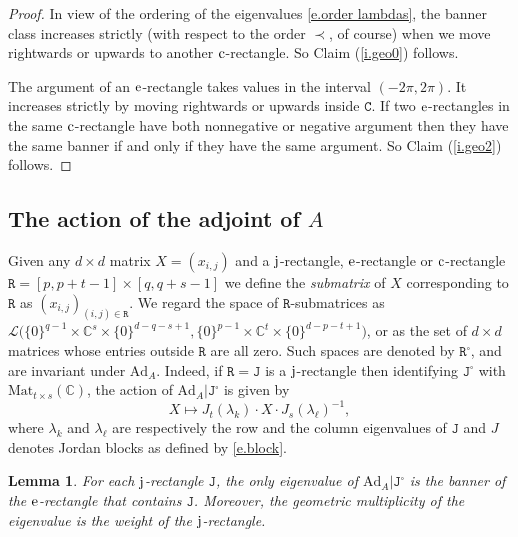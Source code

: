 \documentclass[10pt, a4paper]{amsart}
\theoremstyle{plain}
\newtheorem{lemma}{Lemma}[section]
\theoremstyle{definition}
\theoremstyle{remark}
\theoremstyle{note}
\numberwithin{equation}{section}
\begin{document}
\begin{proof}
In view of the ordering of the eigenvalues \eqref{e.order lambdas},
the banner class increases strictly (with respect to the order $\prec$, of course)
when we move rightwards or upwards to another $\rm c$-rectangle.
So Claim (\ref{i.geo0}) follows.

The argument of an $\rm e$-rectangle takes values in the interval $(-2\pi,2\pi)$.
It increases strictly by moving rightwards or upwards inside ${\mathtt{C}}$. 
If two $\rm e$-rectangles in the same $\rm c$-rectangle have both nonnegative or negative argument then 
they have the same banner if and only if they have the same argument.
So Claim (\ref{i.geo2}) follows.
\end{proof}

\subsection{The action of the adjoint of $A$}\label{ss.ad_geo}

Given any $d\times d$ matrix $X = (x_{i,j})$ and 
a $\rm j$-rectangle, $\rm e$-rectangle or $\rm c$-rectangle ${\mathtt{R}} = [p,p+t-1] \times [q, q+s-1]$
we define the \emph{submatrix} of $X$ corresponding to ${\mathtt{R}}$ 
as $(x_{i,j})_{(i,j) \in {\mathtt{R}}}$.
We regard the space of ${\mathtt{R}}$-submatrices as 
$\mathcal{L} \big( \{0\}^{q-1} \times {\mathbb{C}}^s \times \{0\}^{d-q-s+1} , \{0\}^{p-1} \times {\mathbb{C}}^t \times \{0\}^{d-p-t+1} \big)$,
or as the set of $d \times d$ matrices whose entries outside ${\mathtt{R}}$ are all zero.
Such spaces are denoted by ${\mathtt{R}}^\square$, and are invariant under ${\mathrm{Ad}}_A$.
Indeed, if ${\mathtt{R}} = {\mathtt{J}}$ is a $\rm j$-rectangle 
then identifying ${\mathtt{J}}^\square$ with ${\mathrm{Mat}}_{t\times s}({\mathbb{C}})$, the action
of ${\mathrm{Ad}}_A | {\mathtt{J}}^\square$ is given by
$$
X \mapsto J_{t}(\lambda_k) \cdot X \cdot J_{s}(\lambda_\ell)^{-1},
$$
where $\lambda_k$ and $\lambda_\ell$ 
are respectively the row and the column eigenvalues of ${\mathtt{J}}$
and $J$ denotes Jordan blocks as defined by \eqref{e.block}.

\medskip

\begin{lemma}\label{l.min}
For each $\rm j$-rectangle ${\mathtt{J}}$, 
the only eigenvalue of ${\mathrm{Ad}}_A | {\mathtt{J}}^\square$ is the banner of the $\rm e$-rectangle that contains ${\mathtt{J}}$.
Moreover, the geometric multiplicity of the eigenvalue is the weight of the $\rm j$-rectangle.
\end{lemma}
\end{document}

